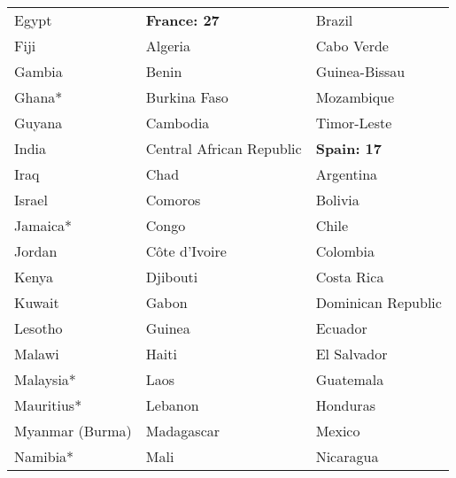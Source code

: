 \begin{table}[h!]
\begin{threeparttable}
\begin{tabular*}{\textwidth}{@{\extracolsep{\fill}}lll@{\extracolsep{\fill}}}
                           Egypt 	&	                \textbf{France: 27}	&	                          Brazil 	\\
                            Fiji 	&	                         Algeria    &	                      Cabo Verde 	\\
                          Gambia 	&	                           Benin 	&	                   Guinea-Bissau 	\\
                           Ghana* 	&	                    Burkina Faso 	&	                      Mozambique 	\\
                            Guyana 	&	                        Cambodia 	&	                     Timor-Leste 	\\
                           India 	&	        Central African Republic 	&	                \textbf{Spain: 17}	\\
                            Iraq 	&	                            Chad 	&	                        Argentina 	\\
                          Israel 	&	                         Comoros 	&	                         Bolivia 	\\
                         Jamaica*	&	                           Congo 	&	                           Chile 	\\
                          Jordan 	&	                    C\^ote d'Ivoire	&	                        Colombia 	\\
                           Kenya 	&	                        Djibouti 	&	                      Costa Rica 	\\
                          Kuwait 	&	                           Gabon 	&	              Dominican Republic 	\\
                         Lesotho 	&	                          Guinea 	&	                         Ecuador 	\\
                          Malawi 	&	                           Haiti 	&	                     El Salvador 	\\
                        Malaysia* 	&	                            Laos 	&	                       Guatemala 	\\
                       Mauritius* 	&	                         Lebanon 	&	                        Honduras 	\\
                 Myanmar (Burma) 	&	                      Madagascar 	&	                          Mexico 	\\
                        Namibia* 	&	                            Mali 	&	                       Nicaragua 	\\

\end{tabular*}
\end{threeparttable}
\end{table}
